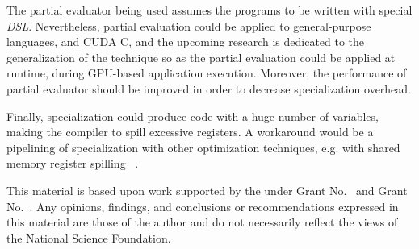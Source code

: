 \documentclass[sigplan]{acmart}\settopmatter{printacmref=false, printfolios=false}
\begin{document}
The partial evaluator being used assumes the programs to be written with special \textit{DSL}.
Nevertheless, partial evaluation could be applied to general-purpose languages, and CUDA C, and the upcoming research is dedicated to the generalization of the technique so as the partial evaluation could be applied at runtime, during GPU-based application execution.
Moreover, the performance of partial evaluator should be improved in order to decrease specialization overhead.

Finally, specialization could produce code with a huge number of variables, making the compiler to spill excessive registers. A workaround would be a pipelining of specialization with other optimization techniques, e.g. with shared memory register spilling ~\cite{Sakdhnagool2019RegDemIG}.

\begin{acks}                            %
  This material is based upon work supported by the
   under Grant
  No.~ and Grant
  No.~.  Any opinions, findings, and
  conclusions or recommendations expressed in this material are those
  of the author and do not necessarily reflect the views of the
  National Science Foundation.
\end{acks}






\end{document}
